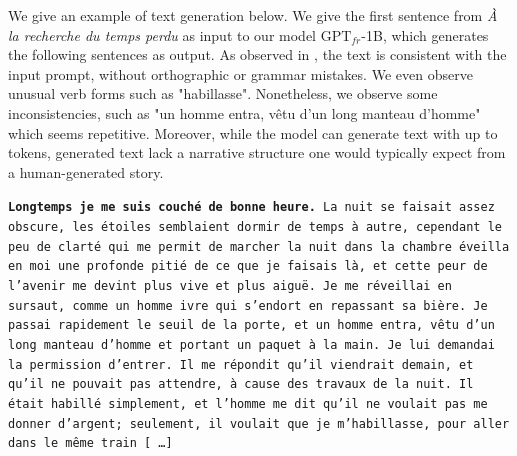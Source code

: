 We give an example of text generation below. We give the first sentence from \textit{\`{A} la recherche du temps perdu} as input to our model $\text{GPT}_{fr}$-1B, which generates the following sentences as output. As observed in \textcite{linzen_2020}, the text is consistent with the input prompt, without orthographic or grammar mistakes. We even observe unusual verb forms such as "habillasse". Nonetheless, we observe some inconsistencies, such as "un homme entra, vêtu d'un long manteau d'homme" which seems repetitive. Moreover, while the model can generate text with up to  tokens, generated text lack a narrative structure one would typically expect from a human-generated story.

\texttt{\textbf{Longtemps je me suis couch\'{e} de bonne heure.} La nuit se faisait assez obscure, les \'{e}toiles semblaient dormir de temps à autre, cependant le peu de clart\'{e} qui me permit de marcher la nuit dans la chambre \'{e}veilla en moi une profonde piti\'{e} de ce que je faisais l\`{a}, et cette peur de l'avenir me devint plus vive et plus aigu\"{e}. Je me r\'{e}veillai en sursaut, comme un homme ivre qui s'endort en repassant sa bi\`{e}re. Je passai rapidement le seuil de la porte, et un homme entra, v\^{e}tu d'un long manteau d'homme et portant un paquet à la main. Je lui demandai la permission d'entrer. Il me r\'{e}pondit qu'il viendrait demain, et qu'il ne pouvait pas attendre, à cause des travaux de la nuit. Il \'{e}tait habill\'{e} simplement, et l'homme me dit qu'il ne voulait pas me donner d'argent; seulement, il voulait que je m'habillasse, pour aller dans le même train \textup{[\,\dots]}}


